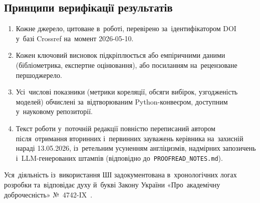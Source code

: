 \subsection*{Принципи верифікації результатів}

\begin{enumerate}
    \item Кожне джерело, цитоване в~роботі, перевірено за~ідентифікатором DOI у~базі Crossref на~момент 2026-05-10.
    \item Кожен ключовий висновок підкріплюється або емпіричними даними (бібліометрика, експертне оцінювання), або посиланням на~рецензоване першоджерело.
    \item Усі~числові показники (метрики кореляції, обсяги вибірок, узгодженість моделей) обчислені за~відтворюваним Python-конвеєром, доступним у~науковому репозиторії.
    \item Текст роботи у~поточній редакції повністю переписаний автором після~отримання вторинних і~первинних зауважень керівника на~захисній нараді 13.05.2026, із~ретельним усуненням англіцизмів, надмірних запозичень і~LLM-генерованих штампів (відповідно до~\texttt{PROOFREAD\_NOTES.md}).
\end{enumerate}

Уся~діяльність із~використання ШІ задокументована в~хронологічних логах розробки та~відповідає духу й~букві Закону України «Про~академічну доброчесність» №~4742-IX~\cite{AkademichnaDobrochesnist2024}.
